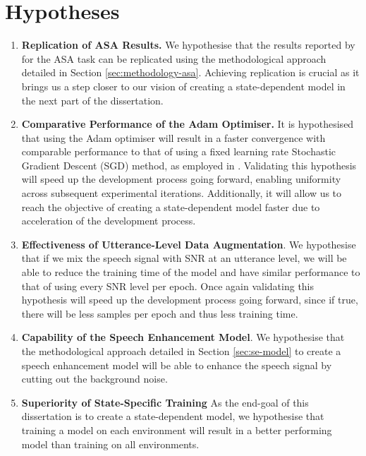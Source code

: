 \documentclass[logo,bsc,singlespacing,parskip,online]{infthesis}
\begin{document}
\section{Hypotheses}
\label{sec:hypotheses}
\begin{enumerate}
   \item \textbf{Replication of ASA Results.} 
   We hypothesise that the results reported by \citet{Huwel2020HearDS} for the ASA task can be replicated using the methodological approach detailed in Section \ref{sec:methodology-asa}.
   Achieving replication is crucial as it brings us a step closer to our vision of creating a state-dependent model in the next part of the dissertation.
   \item \textbf{Comparative Performance of the Adam Optimiser.}
   It is hypothesised that using the Adam optimiser will result in a faster convergence with comparable performance to that of using a fixed learning rate Stochastic Gradient Descent (SGD) method, as employed in \citet{Huwel2020HearDS}.
   Validating this hypothesis will speed up the development process going forward, 
   enabling uniformity across subsequent experimental iterations. Additionally,
   it will allow us to reach the objective of creating a state-dependent model faster due to acceleration of the development process.
   \item \textbf{Effectiveness of Utterance-Level Data Augmentation}. We hypothesise 
   that if we mix the speech signal with SNR at an utterance level, we will be able 
   to reduce the training time of the model and have similar performance to that of using 
   every SNR level per epoch. 
   Once again validating this hypothesis will speed up the development process going forward, 
   since if true, there will be less samples per epoch and thus less training time. 
   \item \textbf{Capability of the Speech Enhancement Model}.
   We hypothesise that the methodological approach detailed in Section \ref{sec:se-model} to 
   create a speech enhancement model will be able to enhance the speech signal by 
   cutting out the background noise. 
   \item \textbf{Superiority of State-Specific Training}
   As the end-goal of this dissertation is to create a state-dependent model, we hypothesise that
   training a model on each environment will result in a better performing model than training on all environments.

\end{enumerate}
\end{document}
